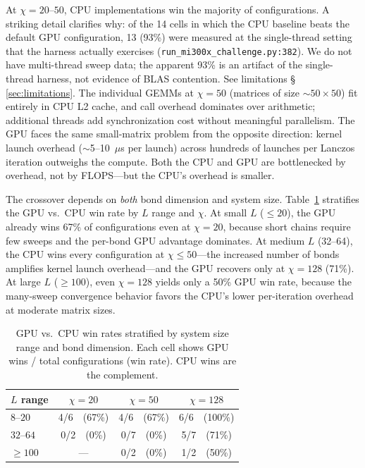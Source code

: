 \documentclass[preprint,12pt]{elsarticle}
\begin{document}
At $\chi = 20$--$50$, CPU implementations win the majority of configurations.
A striking detail clarifies why: of the 14 cells in which the CPU baseline beats the default GPU configuration, 13 (93\%) were measured at the single-thread setting that the harness actually exercises (\texttt{run\_mi300x\_challenge.py:382}). We do not have multi-thread sweep data; the apparent 93\% is an artifact of the single-thread harness, not evidence of BLAS contention. See limitations \S\,\ref{sec:limitations}.
The individual GEMMs at $\chi = 50$ (matrices of size $\sim 50 \times 50$) fit entirely in CPU L2 cache, and call overhead dominates over arithmetic; additional threads add synchronization cost without meaningful parallelism.
The GPU faces the same small-matrix problem from the opposite direction: kernel launch overhead ($\sim$5--10~$\mu$s per launch) across hundreds of launches per Lanczos iteration outweighs the compute.
Both the CPU and GPU are bottlenecked by overhead, not by FLOPS---but the CPU's overhead is smaller.

The crossover depends on \emph{both} bond dimension and system size.
Table~\ref{tab:crossover_Lchi} stratifies the GPU vs.\ CPU win rate by $L$ range and $\chi$.
At small $L$ ($\leq 20$), the GPU already wins 67\% of configurations even at $\chi = 20$, because short chains require few sweeps and the per-bond GPU advantage dominates.
At medium $L$ (32--64), the CPU wins every configuration at $\chi \leq 50$---the increased number of bonds amplifies kernel launch overhead---and the GPU recovers only at $\chi = 128$ (71\%).
At large $L$ ($\geq 100$), even $\chi = 128$ yields only a 50\% GPU win rate, because the many-sweep convergence behavior favors the CPU's lower per-iteration overhead at moderate matrix sizes.

\begin{table}[h]
\centering
\caption{GPU vs.\ CPU win rates stratified by system size range and bond dimension.  Each cell shows GPU wins / total configurations (win rate).  CPU wins are the complement.}
\label{tab:crossover_Lchi}
\begin{tabular}{lccc}
\toprule
$L$ range & $\chi = 20$ & $\chi = 50$ & $\chi = 128$ \\
\midrule
$8$--$20$   & 4/6~~(67\%) & 4/6~~(67\%) & 6/6~~(100\%) \\
$32$--$64$  & 0/2~~(0\%)  & 0/7~~(0\%)  & 5/7~~(71\%) \\
$\geq 100$  & ---         & 0/2~~(0\%)  & 1/2~~(50\%) \\
\bottomrule
\end{tabular}
\end{table}
\end{document}
